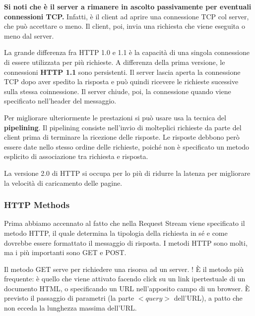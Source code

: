         \vspace{3mm}
        
        \textbf{Si noti che è il server a rimanere in ascolto passivamente per eventuali connessioni TCP.} Infatti, è il client ad aprire una connessione TCP col server, che può accettare o meno. Il client, poi, invia una richiesta che viene eseguita o meno dal server.
        
        \vspace{3mm}
        
        La grande differenza fra HTTP 1.0 e 1.1 è la capacità di una singola connessione di essere utilizzata per più richieste. A differenza della prima versione, le connessioni \textbf{HTTP 1.1} sono persistenti. Il server lascia aperta la connessione TCP dopo aver spedito la risposta e può quindi ricevere le richieste sucessive sulla stessa coinnessione. Il server chiude, poi, la connessione quando viene specificato nell'header del messaggio. 
        
        \vspace{3mm}
        
        Per migliorare ulteriormente le prestazioni si può usare usa la tecnica del \textbf{pipelining}. Il pipelining consiste nell’invio di molteplici richieste da parte del client prima di terminare la ricezione delle risposte. Le risposte debbono però essere date nello stesso ordine delle richieste, poiché non è specificato un metodo esplicito di associazione tra richiesta e risposta.
        
        \vspace{3mm}
        
        La versione 2.0 di HTTP si occupa per lo più di ridurre la latenza per migliorare la velocità di caricamento delle pagine.
        
        \subsubsection{HTTP Methods}
            
            Prima abbiamo accennato al fatto che nella Request Stream viene specificato il metodo HTTP, il quale determina la tipologia della richiesta in sé e come dovrebbe essere formattato il messaggio di risposta. I metodi HTTP sono molti, ma i più importanti sono GET e POST.
            
            \vspace{3mm}
            
            Il metodo GET serve per richiedere una risorsa ad un server. ! È il metodo più frequente: è quello che viene attivato
            facendo click su un link ipertestuale di un documento HTML, o specificando un URL nell’apposito campo di un browser. È previsto il passaggio di parametri (la parte \(<query>\) dell’URL), a patto che non ecceda la lunghezza massima dell'URL.
            
